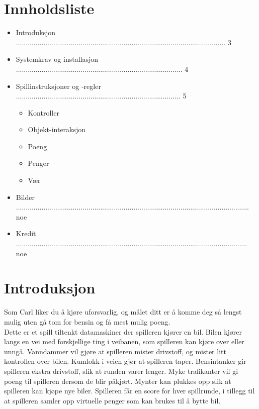 \documentclass[paper=a4]{article}
\begin{document}
\section{Innholdsliste}
\begin{itemize}
	\item Introduksjon ........................................................................................................... 3
	\item Systemkrav og installasjon ..................................................................................... 4
	\item Spillinstruksjoner og -regler .................................................................................... 5
		\begin{itemize} 
			\item Kontroller
			\item Objekt-interaksjon
			\item Poeng
			\item Penger
			\item Vær
		\end{itemize}
	\item Bilder ....................................................................................................................... noe
	\item Kredit ...................................................................................................................... noe
\end{itemize}
\newpage

\section{Introduksjon}
Som Carl liker du å kjøre uforsvarlig, og målet ditt er å komme deg så lengst mulig uten gå tom for bensin og få mest mulig poeng. \\

Dette er et spill tiltenkt datamaskiner der spilleren kjører en bil.
Bilen kjører langs en vei med forskjellige ting i veibanen, som spilleren kan kjøre over eller unngå.
Vanndammer vil gjøre at spilleren mister drivstoff, og mister litt kontrollen over bilen.
Kumlokk i veien gjør at spilleren taper.
Bensintanker gir spilleren ekstra drivstoff, slik at runden varer lenger.
Myke trafikanter vil gi poeng til spilleren dersom de blir påkjørt.
Mynter kan plukkes opp slik at spilleren kan kjøpe nye biler.
Spilleren får en score for hver spillrunde, i tillegg til at spilleren samler opp virtuelle penger som kan brukes til å bytte bil.
\newpage
\end{document}
